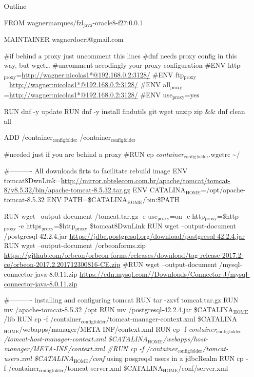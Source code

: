 \documentclass[presentation]{beamer}
\author{wagner}
\date{\today}
\title{}
\begin{document}
\begin{frame}{Outline}
\tableofcontents
\end{frame}

FROM wagnermarques/fzl\(_{\text{java}}\)-oracle8-f27:0.0.1

MAINTAINER wagnerdocri@gmail.com

\#if behind a proxy just uncomment this lines
\#dnf needs proxy config in this way, but wget\ldots{}
\#uncomment accodingly your proxy configuration
\#ENV http\(_{\text{proxy}}\)=\url{http://wagner:nicolas1*@192.168.0.2:3128/}
\#ENV ftp\(_{\text{proxy}}\)=\url{http://wagner:nicolas1*@192.168.0.2:3128/}
\#ENV all\(_{\text{proxy}}\)=\url{http://wagner:nicolas1*@192.168.0.2:3128/}
\#ENV use\(_{\text{proxy}}\)=yes


RUN dnf -y update
RUN dnf -y install findutils git wget unzip zip  \&\& dnf clean all

ADD /container\(_{\text{config}}\)\(_{\text{folder}}\) /container\(_{\text{config}}\)\(_{\text{folder}}\) 


\#needed just if you are behind a proxy
\#RUN cp \emph{container\(_{\text{config}}\)\(_{\text{folder}}\)}.wgetrc  \textasciitilde{}/



\#---------- All downloads firts to facilitate rebuild image
ENV tomcat8DwnLink=\url{http://mirror.nbtelecom.com.br/apache/tomcat/tomcat-8/v8.5.32/bin/apache-tomcat-8.5.32.tar.gz}
ENV CATALINA\(_{\text{HOME}}\)=/opt/apache-tomcat-8.5.32
ENV PATH=\$CATALINA\(_{\text{HOME}}\)/bin:\$PATH

RUN wget --output-document /tomcat.tar.gz  -e use\(_{\text{proxy}}\)=on -e http\(_{\text{proxy}}\)=\$http\(_{\text{proxy}}\) -e https\(_{\text{proxy}}\)=\$http\(_{\text{proxy}}\) \$tomcat8DwnLink
RUN wget --output-document /postgresql-42.2.4.jar \url{https://jdbc.postgresql.org/download/postgresql-42.2.4.jar}
RUN wget --output-document /orbeonforms.zip \url{https://github.com/orbeon/orbeon-forms/releases/download/tag-release-2017.2-ce/orbeon-2017.2.201712300816-CE.zip}
\#RUN wget --output-document /mysql-connector-java-8.0.11.zip \url{https://cdn.mysql.com//Downloads/Connector-J/mysql-connector-java-8.0.11.zip}




\#---------- installing and configuring tomcat
RUN tar -zxvf  tomcat.tar.gz
RUN mv /apache-tomcat-8.5.32 /opt
RUN mv /postgresql-42.2.4.jar \$CATALINA\(_{\text{HOME}}\)/lib
RUN cp -f /container\(_{\text{config}}\)\(_{\text{folder}}\)/tomcat-manager-context.xml \$CATALINA\(_{\text{HOME}}\)/webapps/manager/META-INF/context.xml
RUN cp -f \emph{container\(_{\text{config}}\)\(_{\text{folder}}\)/tomcat-host-manager-context.xml \$CATALINA\(_{\text{HOME}}\)/webapps/host-manager/META-INF/context.xml
\#RUN cp -f /container\(_{\text{config}}\)\(_{\text{folder}}\)/tomcat-users.xml  \$CATALINA\(_{\text{HOME}}\)/conf} using posgreqsl users in a jdbcRealm
RUN cp -f /container\(_{\text{config}}\)\(_{\text{folder}}\)/tomcat-server.xml  \$CATALINA\(_{\text{HOME}}\)/conf/server.xml
\end{document}
